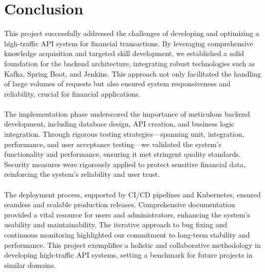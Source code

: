 \documentclass[12pt,a4paper]{report}
\begin{document}
\chapter{Conclusion}

\noindent This project successfully addressed the challenges of developing and optimizing a high-traffic API system for financial transactions. By leveraging comprehensive knowledge acquisition and targeted skill development, we established a solid foundation for the backend architecture, integrating robust technologies such as Kafka, Spring Boot, and Jenkins. This approach not only facilitated the handling of large volumes of requests but also ensured system responsiveness and reliability, crucial for financial applications.
\\\\
\noindent The implementation phase underscored the importance of meticulous backend development, including database design, API creation, and business logic integration. Through rigorous testing strategies—spanning unit, integration, performance, and user acceptance testing—we validated the system’s functionality and performance, ensuring it met stringent quality standards. Security measures were rigorously applied to protect sensitive financial data, reinforcing the system’s reliability and user trust.
\\\\
\noindent The deployment process, supported by CI/CD pipelines and Kubernetes, ensured seamless and scalable production releases. Comprehensive documentation provided a vital resource for users and administrators, enhancing the system’s usability and maintainability. The iterative approach to bug fixing and continuous monitoring highlighted our commitment to long-term stability and performance. This project exemplifies a holistic and collaborative methodology in developing high-traffic API systems, setting a benchmark for future projects in similar domains.
\end{document}
